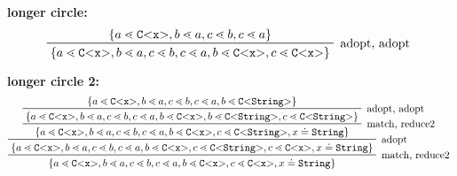 \textbf{longer circle:}\\
\begin{displaymath}
    \prftree[r]{
        adopt, adopt
}{
\set{a \lessdot \exptype{C}{x}, b \lessdot a, c \lessdot b, c \lessdot a}
}{
\set{a \lessdot \exptype{C}{x}, b \lessdot a,
c \lessdot b, c \lessdot a, b \lessdot \exptype{C}{x}, c \lessdot \exptype{C}{x}}
}
\end{displaymath}

\textbf{longer circle 2:}\\
\begin{displaymath}
    \prftree[r]{
        match, reduce2
    }{
\prftree[r]{
    adopt
        }{
    \prftree[r]{
        match, reduce2
            }{
    \prftree[r]{
        adopt, adopt
}{
\set{a \lessdot \exptype{C}{x}, b \lessdot a, c \lessdot b, c \lessdot a, b \lessdot \exptype{C}{String}}
}{
\set{a \lessdot \exptype{C}{x}, b \lessdot a,
c \lessdot b, c \lessdot a, b \lessdot \exptype{C}{x}, b \lessdot \exptype{C}{\tt{String}}, c \lessdot \exptype{C}{\tt{String}}}
}
}{
    \set{a \lessdot \exptype{C}{x}, b \lessdot a,
    c \lessdot b, c \lessdot a, b \lessdot \exptype{C}{x}, c \lessdot \exptype{C}{\tt{String}}, x \doteq \tt{String}}    
}}
{
    \set{a \lessdot \exptype{C}{x}, b \lessdot a,
    c \lessdot b, c \lessdot a, b \lessdot \exptype{C}{x}, c \lessdot \exptype{C}{\tt{String}}, c \lessdot \exptype{C}{x}, x \doteq \tt{String}}   
}}{
    \set{a \lessdot \exptype{C}{x}, b \lessdot a,
    c \lessdot b, c \lessdot a, b \lessdot \exptype{C}{x}, c \lessdot \exptype{C}{x}, x \doteq \tt{String}}   
        }
\end{displaymath}

